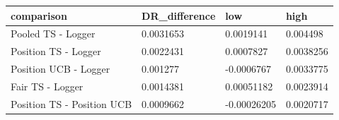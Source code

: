 \begin{tabular}{llll}
\hline
comparison & DR\_difference & low & high \\
\hline
Pooled TS - Logger & 0.0031653 & 0.0019141 & 0.004498 \\
Position TS - Logger & 0.0022431 & 0.0007827 & 0.0038256 \\
Position UCB - Logger & 0.001277 & -0.0006767 & 0.0033775 \\
Fair TS - Logger & 0.0014381 & 0.00051182 & 0.0023914 \\
Position TS - Position UCB & 0.0009662 & -0.00026205 & 0.0020717 \\
\hline
\end{tabular}